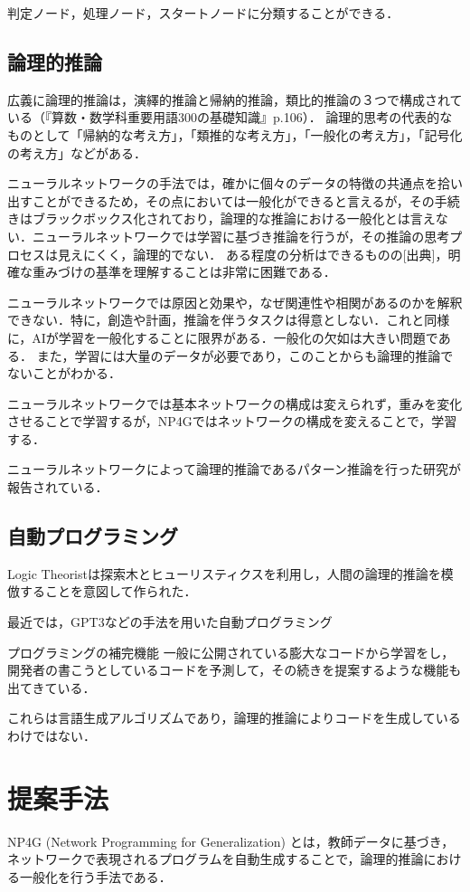 \documentclass[exploratorypaper]{jsaiart} %
\begin{document}
判定ノード，処理ノード，スタートノードに分類することができる．

\subsection{論理的推論}
広義に論理的推論は，演繹的推論と帰納的推論，類比的推論の３つで構成されている（『算数・数学科重要用語300の基礎知識』p.106）．
論理的思考の代表的なものとして「帰納的な考え方」，「類推的な考え方」，「一般化の考え方」，「記号化の考え方」などがある\cite{saito:11}．

ニューラルネットワークの手法では，確かに個々のデータの特徴の共通点を拾い出すことができるため，その点においては一般化ができると言えるが，その手続きはブラックボックス化されており，論理的な推論における一般化とは言えない．ニューラルネットワークでは学習に基づき推論を行うが，その推論の思考プロセスは見えにくく，論理的でない．
ある程度の分析はできるものの[出典]，明確な重みづけの基準を理解することは非常に困難である．

ニューラルネットワークでは原因と効果や，なぜ関連性や相関があるのかを解釈できない．特に，創造や計画，推論を伴うタスクは得意としない．これと同様に，AIが学習を一般化することに限界がある．一般化の欠如は大きい問題である．
また，学習には大量のデータが必要であり，このことからも論理的推論でないことがわかる．

ニューラルネットワークでは基本ネットワークの構成は変えられず，重みを変化させることで学習するが，NP4Gではネットワークの構成を変えることで，学習する．

ニューラルネットワークによって論理的推論であるパターン推論を行った研究が報告されている\cite{tsukimoto:00}\cite{sudo:07}．


\subsection{自動プログラミング}
Logic Theorist\cite{LogicTheorist}は探索木とヒューリスティクスを利用し，人間の論理的推論を模倣することを意図して作られた．

最近では，GPT3\cite{gpt3}などの手法を用いた自動プログラミング

プログラミングの補完機能
一般に公開されている膨大なコードから学習をし，開発者の書こうとしているコードを予測して，その続きを提案するような機能も出てきている\cite{copilot}．

これらは言語生成アルゴリズムであり，論理的推論によりコードを生成しているわけではない．

\section{提案手法}
NP4G (Network Programming for Generalization) とは，教師データに基づき，ネットワークで表現されるプログラムを自動生成することで，論理的推論における一般化を行う手法である．
\end{document}
